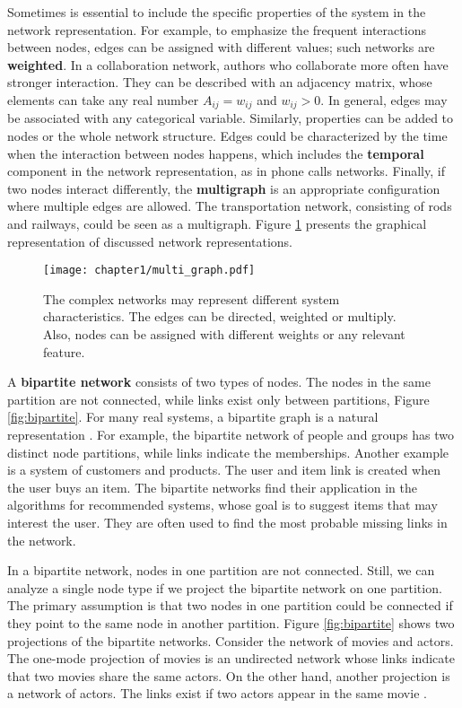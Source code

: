 Sometimes is essential to include the specific properties of the system in the network representation. For example, to emphasize the frequent interactions between nodes, edges can be assigned with different values; such networks are \textbf{weighted}. In a collaboration network, authors who collaborate more often have stronger interaction. They can be described with an adjacency matrix, whose elements can take any real number $A_{ij}=w_{ij}$ and $w_{ij}>0$. In general, edges may be associated with any categorical variable. Similarly, properties can be added to nodes or the whole network structure. Edges could be characterized by the time when the interaction between nodes happens, which includes the \textbf{temporal} component in the network representation, as in phone calls networks. Finally, if two nodes interact differently, the \textbf{multigraph} is an appropriate configuration where multiple edges are allowed. The transportation network, consisting of rods and railways, could be seen as a multigraph. Figure \ref{fig:multigraph} presents the graphical representation of discussed network representations.


\begin{figure}[h]
	\centering
	\texttt{[image: chapter1/multi\_graph.pdf]} 
	\caption[Different network representations.]{The complex networks may represent different system characteristics. The edges can be directed, weighted or multiply. Also, nodes can be assigned with different weights or any relevant feature.}
	\label{fig:multigraph}
\end{figure}

A \textbf{bipartite network} consists of two types of nodes. The nodes in the same partition are not connected, while links exist only between partitions, Figure \ref{fig:bipartite}. For many real systems, a bipartite graph is a natural representation \cite{barabasi2016network, latora2017complex}. For example, the bipartite network of people and groups has two distinct node partitions, while links indicate the memberships. Another example is a system of customers and products. The user and item link is created when the user buys an item. The bipartite networks find their application in the algorithms for recommended systems, whose goal is to suggest items that may interest the user. They are often used to find the most probable missing links in the network. 

In a bipartite network, nodes in one partition are not connected. Still, we can analyze a single node type if we project the bipartite network on one partition. The primary assumption is that two nodes in one partition could be connected if they point to the same node in another partition. Figure \ref{fig:bipartite} shows two projections of the bipartite networks. Consider the network of movies and actors. The one-mode projection of movies is an undirected network whose links indicate that two movies share the same actors. On the other hand, another projection is a network of actors. The links exist if two actors appear in the same movie \cite{newman2010, barabasi2016network}.

